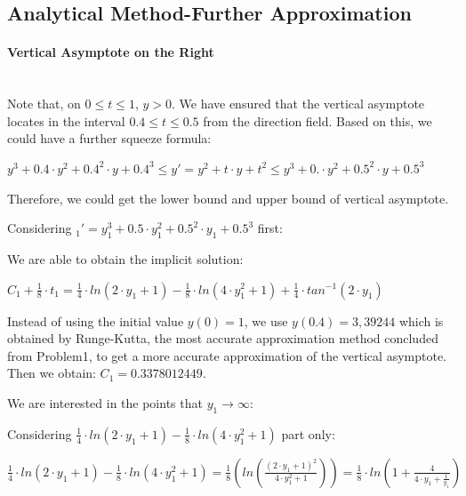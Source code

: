 \documentclass[11pt,a4paper]{article}
\begin{document}
\subsection{Analytical Method-Further Approximation}
\begin{multicols}{2}
	\small
	\paragraph{\small Vertical Asymptote on the Right}
	
	~\\
	
	Note that, on $0 \leq t \leq 1$, $y > 0$. We have ensured that the vertical asymptote locates in the interval $0.4 \leq t \leq 0.5$ from the direction field. Based on this, we could have a further squeeze formula: 
	
	\begin{center}
		$y^3+0.4 \cdot y^2 + 0.4^2 \cdot y + 0.4^3 \leq y' = y^2+t \cdot y + t^2 \leq y^3 + 0. \cdot y^2 + 0.5^2 \cdot y + 0.5^3$
	\end{center}
	
	Therefore, we could get the lower bound and upper bound of vertical asymptote. 
	
	Considering $_1'=y_1^3+0.5 \cdot y_1^2 + 0.5^2 \cdot y_1 + 0.5^3$ first:
	
	We are able to obtain the implicit solution:
	
	\begin{center}
		$C_1+\frac{1}{8} \cdot t_1 = \frac{1}{4} \cdot ln(2 \cdot y_1+1)- \frac{1}{8}\cdot ln(4\cdot y_1^2+1)+\frac{1}{4}\cdot tan^{-1}(2 \cdot y_1)$
	\end{center}
	
	Instead of using the initial value $y(0)=1$, we use $y(0.4)=3,39244$ which is obtained by Runge-Kutta, the most accurate approximation method concluded from Problem1, to get a more accurate approximation of the vertical asymptote. Then we obtain: $C_1=0.3378012449$.
	
	We are interested in the points that $y_1 \rightarrow \infty$:
	
	Considering $\frac{1}{4} \cdot ln(2 \cdot y_1 + 1)-\frac{1}{8}\cdot ln(4 \cdot y_1^2+1)$ part only:
	
	\begin{center}
		$\frac{1}{4} \cdot ln(2\cdot y_1 + 1)- \frac{1}{8}\cdot ln(4\cdot y_1^2+1) = \frac{1}{8}(ln(\frac{(2\cdot y_1+1)^2}{4\cdot y_1^2+1}))=\frac{1}{8}\cdot ln(1+\frac{4}{4\cdot y_1+\frac{1}{y_1}})$
	\end{center}
	

\end{multicols}
\end{document}
